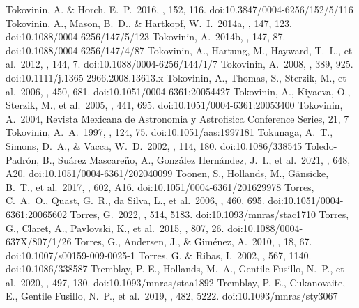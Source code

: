 \documentclass[twocolumn,tighten,twocolappendix]{aastex631}
\begin{document}
\begin{thebibliography}{}
 Tokovinin, A. \& Horch, E.~P.\ 2016, \aj, 152, 116. doi:10.3847/0004-6256/152/5/116
 Tokovinin, A., Mason, B.~D., \& Hartkopf, W.~I.\ 2014a, \aj, 147, 123. doi:10.1088/0004-6256/147/5/123
 Tokovinin, A.\ 2014b, \aj, 147, 87. doi:10.1088/0004-6256/147/4/87
 Tokovinin, A., Hartung, M., Hayward, T.~L., et al.\ 2012, \aj, 144, 7. doi:10.1088/0004-6256/144/1/7
 Tokovinin, A.\ 2008, \mnras, 389, 925. doi:10.1111/j.1365-2966.2008.13613.x
 Tokovinin, A., Thomas, S., Sterzik, M., et al.\ 2006, \aap, 450, 681. doi:10.1051/0004-6361:20054427
 Tokovinin, A., Kiyaeva, O., Sterzik, M., et al.\ 2005, \aap, 441, 695. doi:10.1051/0004-6361:20053400
 Tokovinin, A.\ 2004, Revista Mexicana de Astronomia y Astrofisica Conference Series, 21, 7
 Tokovinin, A.~A.\ 1997, \aaps, 124, 75. doi:10.1051/aas:1997181
 Tokunaga, A.~T., Simons, D.~A., \& Vacca, W.~D.\ 2002, \pasp, 114, 180. doi:10.1086/338545
 Toledo-Padr{\'o}n, B., Su{\'a}rez Mascare{\~n}o, A., Gonz{\'a}lez Hern{\'a}ndez, J.~I., et al.\ 2021, \aap, 648, A20. doi:10.1051/0004-6361/202040099
 Toonen, S., Hollands, M., G{\"a}nsicke, B.~T., et al.\ 2017, \aap, 602, A16. doi:10.1051/0004-6361/201629978
 Torres, C.~A.~O., Quast, G.~R., da Silva, L., et al.\ 2006, \aap, 460, 695. doi:10.1051/0004-6361:20065602
 Torres, G.\ 2022, \mnras, 514, 5183. doi:10.1093/mnras/stac1710
 Torres, G., Claret, A., Pavlovski, K., et al.\ 2015, \apj, 807, 26. doi:10.1088/0004-637X/807/1/26
 Torres, G., Andersen, J., \& Gim{\'e}nez, A.\ 2010, \aapr, 18, 67. doi:10.1007/s00159-009-0025-1
 Torres, G. \& Ribas, I.\ 2002, \apj, 567, 1140. doi:10.1086/338587
 Tremblay, P.-E., Hollands, M.~A., Gentile Fusillo, N.~P., et al.\ 2020, \mnras, 497, 130. doi:10.1093/mnras/staa1892
 Tremblay, P.-E., Cukanovaite, E., Gentile Fusillo, N.~P., et al.\ 2019, \mnras, 482, 5222. doi:10.1093/mnras/sty3067

\end{thebibliography}
\end{document}

